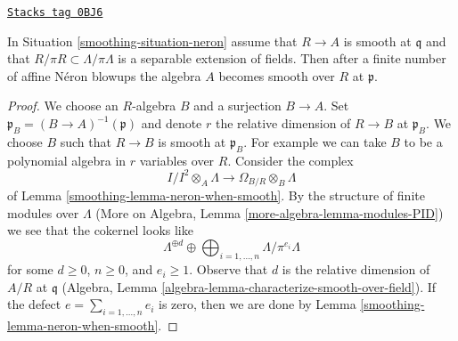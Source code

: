 \begin{lemma}
\label{smoothing-lemma-neron-desingularization}
\href{https://stacks.math.columbia.edu/tag/0BJ6}{\texttt{Stacks tag 0BJ6}}

In Situation \ref{smoothing-situation-neron}
assume that $R \to A$ is smooth at $\mathfrak q$
and that $R/\pi R \subset \Lambda/\pi \Lambda$ is a separable
extension of fields. Then after a finite number of affine N\'eron
blowups the algebra $A$ becomes smooth over $R$ at $\mathfrak p$.
\end{lemma}

\begin{proof}

We choose an $R$-algebra $B$ and a surjection $B \to A$. Set
$\mathfrak p_B = (B \to A)^{-1}(\mathfrak p)$ and denote $r$
the relative dimension of $R \to B$ at $\mathfrak p_B$. We choose $B$
such that $R \to B$ is smooth at $\mathfrak p_B$.
For example we can take $B$ to be a polynomial algebra in $r$ variables
over $R$. Consider the complex
$$
I/I^2 \otimes_A \Lambda \longrightarrow \Omega_{B/R} \otimes_B \Lambda
$$
of Lemma \ref{smoothing-lemma-neron-when-smooth}. By the structure of finite modules
over $\Lambda$ (More on Algebra, Lemma \ref{more-algebra-lemma-modules-PID})
we see that the cokernel looks like
$$
\Lambda^{\oplus d} \oplus
\bigoplus\nolimits_{i = 1, \ldots, n} \Lambda/\pi^{e_i} \Lambda
$$
for some $d \geq 0$, $n \geq 0$, and $e_i \geq 1$. Observe that $d$
is the relative dimension of $A/R$ at $\mathfrak q$
(Algebra, Lemma \ref{algebra-lemma-characterize-smooth-over-field}).
If the defect $e = \sum_{i = 1, \ldots, n} e_i$ is zero, then we are done by
Lemma \ref{smoothing-lemma-neron-when-smooth}.


\end{proof}
